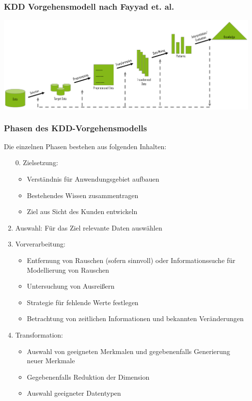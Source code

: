 \begin{frame}
\frametitle{KDD Vorgehensmodell nach Fayyad et. al.}
\includegraphics[scale=0.6]{images/faxxer-kdd.PNG} 
\end{frame}
\begin{frame}
\frametitle{Phasen des KDD-Vorgehensmodells}
Die einzelnen Phasen bestehen aus folgenden Inhalten:
\begin{enumerate}[<+->]
\item[0.] Zielsetzung:
\begin{itemize}[<+->]
\item Verständnis für Anwendungsgebiet aufbauen
\item Bestehendes Wissen zusammentragen
\item Ziel aus Sicht des Kunden entwickeln
\end{itemize}
\item Auswahl: Für das Ziel relevante Daten auswählen
\item Vorverarbeitung:
\begin{itemize}[<+->]
\item Entfernung von Rauschen (sofern sinnvoll) oder Informationssuche für Modellierung von Rauschen
\item Untersuchung von Ausreißern
\item Strategie für fehlende Werte festlegen
\item Betrachtung von zeitlichen Informationen und bekannten Veränderungen
\end{itemize}
\item Transformation:
\begin{itemize}[<+->]
\item Auswahl von geeigneten Merkmalen und gegebenenfalls Generierung neuer Merkmale
\item Gegebenenfalls Reduktion der Dimension
\item Auswahl geeigneter Datentypen
\end{itemize}
\end{enumerate}
\end{frame}
